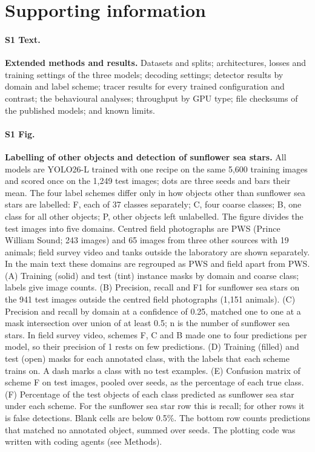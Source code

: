 \section*{Supporting information}

\paragraph*{S1 Text.}
\label{S1_Text}
{\bf Extended methods and results.} Datasets and splits; architectures, losses and training settings of the three models; decoding settings; detector results by domain and label scheme; tracer results for every trained configuration and contrast; the behavioural analyses; throughput by GPU type; file checksums of the published models; and known limits.

\paragraph*{S1 Fig.}
\label{S1_Fig}
{\bf Labelling of other objects and detection of sunflower sea stars.} All models are YOLO26-L trained with one recipe on the same 5,600 training images and scored once on the 1,249 test images; dots are three seeds and bars their mean. The four label schemes differ only in how objects other than sunflower sea stars are labelled: F, each of 37 classes separately; C, four coarse classes; B, one class for all other objects; P, other objects left unlabelled. The figure divides the test images into five domains. Centred field photographs are PWS (Prince William Sound; 243 images) and 65 images from three other sources with 19 animals; field survey video and tanks outside the laboratory are shown separately. In the main text these domains are regrouped as PWS and field apart from PWS.
(A) Training (solid) and test (tint) instance masks by domain and coarse class; labels give image counts.
(B) Precision, recall and F1 for sunflower sea stars on the 941 test images outside the centred field photographs (1,151 animals).
(C) Precision and recall by domain at a confidence of 0.25, matched one to one at a mask intersection over union of at least 0.5; n is the number of sunflower sea stars. In field survey video, schemes F, C and B made one to four predictions per model, so their precision of 1 rests on few predictions.
(D) Training (filled) and test (open) masks for each annotated class, with the labels that each scheme trains on. A dash marks a class with no test examples.
(E) Confusion matrix of scheme F on test images, pooled over seeds, as the percentage of each true class.
(F) Percentage of the test objects of each class predicted as sunflower sea star under each scheme. For the sunflower sea star row this is recall; for other rows it is false detections. Blank cells are below 0.5\%. The bottom row counts predictions that matched no annotated object, summed over seeds. The plotting code was written with coding agents (see Methods).

